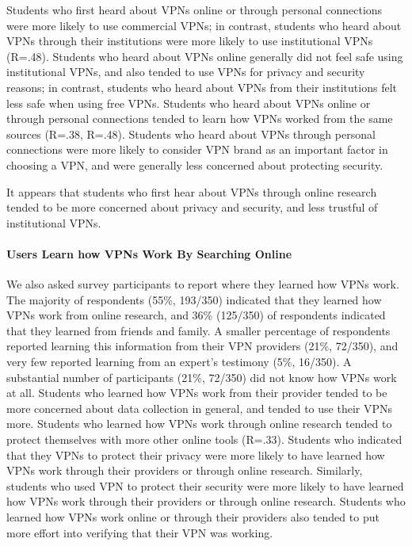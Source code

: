 Students who first heard about VPNs online or through personal connections
were more likely to use commercial VPNs; in contrast, students who heard about
VPNs through their institutions were more likely to use institutional VPNs
(R=.48). Students who heard about VPNs online generally did not feel safe
using institutional VPNs, and also tended to use VPNs for privacy and security
reasons; in contrast, students who heard about VPNs from their institutions
felt less safe when using free VPNs. Students who heard about VPNs online or
through personal connections tended to learn how VPNs worked from the same
sources (R=.38, R=.48). Students who heard about VPNs through personal
connections were more likely to consider VPN brand as an important factor in
choosing a VPN, and were generally less concerned about protecting security. 

It appears that students who first hear about VPNs through online research
tended to be more concerned about privacy and security, and less trustful of
institutional VPNs. 

\paragraph{Users Learn how VPNs Work By Searching Online}
We also asked survey participants to report where they learned how VPNs work.
The majority of respondents (55\%, 193/350) indicated that they learned how
VPNs work from online research, and 36\% (125/350) of respondents indicated
that they learned from friends and family. A smaller percentage of respondents
reported learning this information from their VPN providers (21\%, 72/350),
and very few reported learning from an expert’s testimony (5\%, 16/350). A
substantial number of participants (21\%, 72/350) did not know how VPNs work
at all.  Students who learned how VPNs work from their provider tended to be
more concerned about data collection in general, and tended to use their VPNs
more. Students who learned how VPNs work through online research tended to
protect themselves with more other online tools (R=.33). Students who
indicated that they VPNs to protect their privacy were more likely to have
learned how VPNs work through their providers or through online research.
Similarly, students who used VPN to protect their security were more likely to
have learned how VPNs work through their providers or through online research.
Students who learned how VPNs work online or through their providers also
tended to put more effort into verifying that their VPN was working.

